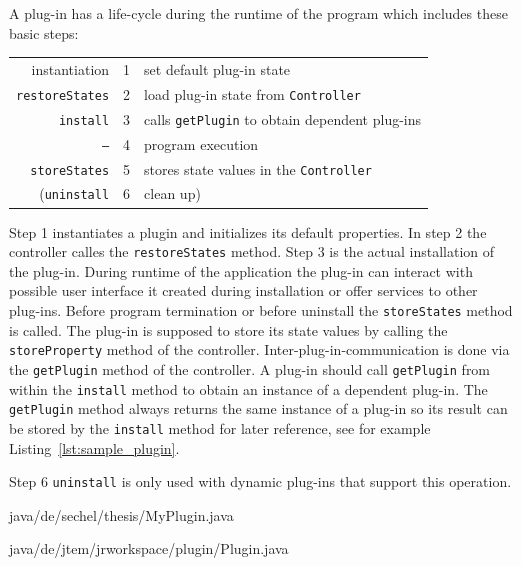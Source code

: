 A plug-in has a life-cycle during the runtime of the program which includes these basic
steps:
\begin{center}
\begin{tabular}{r|r|l}
	instantiation & 1 & set default plug-in state\\
	{\tt restoreStates} & 2 & load plug-in state from {\tt Controller}\\
	{\tt install} & 3 & calls {\tt getPlugin} to obtain dependent plug-ins\\
	{\tt --}  & 4 & program execution\\
	{\tt storeStates} & 5 & stores state values in the {\tt Controller}\\
	({\tt uninstall} & 6 & clean up)
\end{tabular}
\end{center}
Step 1 instantiates a plugin and initializes its default properties. In step 2 the controller 
calles the {\tt restoreStates} method. Step 3 is the actual installation of the plug-in. 
During runtime
of the application the plug-in can interact with possible user interface it created during 
installation or offer services to other plug-ins. 
Before program termination or before uninstall the {\tt storeStates} method is called. The plug-in
is supposed to store its state values by calling the {\tt storeProperty}
method of the controller.
Inter-plug-in-communication is done via the {\tt getPlugin} method of the controller. 
A plug-in should call {\tt getPlugin} from within the {\tt install} method to obtain an instance 
of a dependent plug-in. The {\tt getPlugin} method always returns the same instance of a plug-in so its
result can be stored by the {\tt install} method for later reference, see for example 
Listing~\ref{lst:sample_plugin}.

Step 6 {\tt uninstall} is only used with dynamic plug-ins that support this operation.

 {java/de/sechel/thesis/MyPlugin.java}




 {java/de/jtem/jrworkspace/plugin/Plugin.java}


